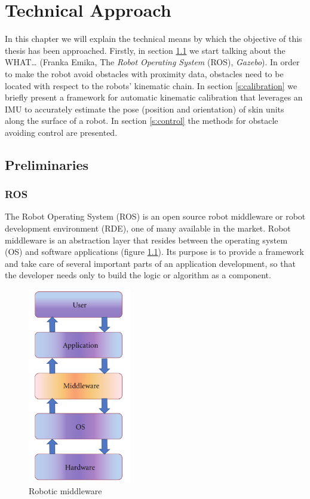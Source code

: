\chapter{Technical Approach}
\label{ch:tec}

In this chapter we will explain the technical means by which the objective of this thesis has been approached. Firstly, in section \ref{s:pre} we start talking about the WHAT… (Franka Emika, The \emph{Robot Operating System} (ROS), \emph{Gazebo}). In order to make the robot avoid obstacles with proximity data, obstacles need to be located with respect to the robots’ kinematic chain. In section \ref{s:calibration} we briefly present a framework for automatic kinematic calibration that leverages an IMU to accurately estimate the pose (position and orientation) of skin units along the surface of a robot. In section \ref{s:control} the methods for obstacle avoiding control are presented.

\section{Preliminaries}
\label{s:pre}
\subsection{ROS}

The Robot Operating System (ROS) is an open source robot middleware or robot development environment (RDE), one of many available in the market. Robot middleware \cite{elkady2009middlew} is an abstraction layer that resides between the operating system (OS) and software applications (figure \ref{fig:middleware}). Its purpose is to provide a framework and  take care of several important parts of an application development, so that the developer needs only to build the logic or algorithm as a component.

\begin{figure}[htbp]
    \caption[Robotic middleware]{
        Robotic middleware \cite{elkady2009middlew}
    }
    \begin{center}
    \includegraphics[width=45mm]{figs/middleware.png}
    \end{center}
\label{fig:middleware}
\end{figure}


